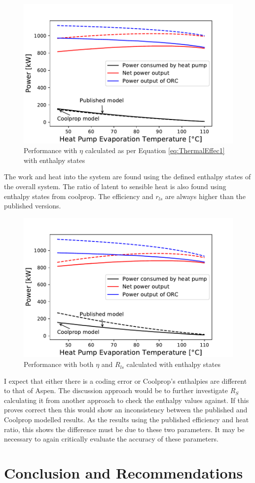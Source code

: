\documentclass[a4paper,12pt]{article}
\begin{document}
\begin{figure}[H]
  \centering
  \includegraphics[scale = 0.65]{Images/Int_R236FA_eta.pdf}
  \caption{Performance with $\eta$ calculated as per Equation \ref{eq:ThermalEffec1} with enthalpy states}\label{fig:Int_eta}
\end{figure}
The work and heat into the system are found using the defined enthalpy states of the overall system. The ratio of latent to sensible heat is also found using enthalpy states from coolprop. The efficiency and $r_{ls}$ are always higher than the published versions. 
\begin{figure}[H]
  \centering
  \includegraphics[scale =0.65]{Images/Int_R236FA_both.pdf}
  \caption{Performance with both $\eta$ and $R_{ls}$ calculated with enthalpy states}\label{fig:Int_both}
\end{figure}
I expect that either there is a coding error or Coolprop's enthalpies are different to that of Aspen. The discussion approach would be to further investigate $R_S$ calculating it from another approach to check the enthalpy values against. If this proves correct then this would show an inconsistency between the published and Coolprop modelled results. As the results using the published efficiency and heat ratio, this shows the difference must be due to these two parameters. It may be necessary to again critically evaluate the accuracy of these parameters.

\newpage
\section{Conclusion and Recommendations}

\printbibliography

\listoftodos
\end{document}
